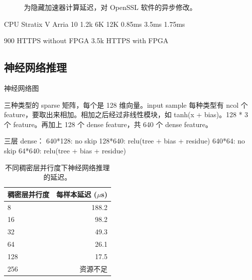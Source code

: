 \begin{figure}[htbp]
	\centering
	\hspace{0.02\textwidth}
	\caption{为隐藏加速器计算延迟，对 OpenSSL 软件的异步修改。}
\end{figure}

CPU   Stratix V     Arria 10
1.2k  6K            12K
0.85ms 3.5ms        1.75ms

900 HTTPS without FPGA
3.5k HTTPS with FPGA

\subsection{神经网络推理}

神经网络图

三种类型的 sparse 矩阵，每个是 128 维向量。input sample 每种类型有 ncol 个 feature，要取出来相加。相加之后经过非线性模块，如 tanh(x + bias)。128 * 3 个 feature。再加上 128 个 dense feature，共 640 个 dense feature。

三层 dense：
640*128: no skip
128*640: relu(tree + bias + residue)
640*64: no skip
64*640: relu(tree + bias + residue)

\begin{table}[htbp]
	\centering
	\caption{不同稠密层并行度下神经网络推理的延迟。}
	\label{clicknp:tab:neural-network}
	\small
	\begin{tabular}{l|r}
		\toprule
		稠密层并行度 & 每样本延迟 ($\mu$s) \\
		\midrule
		8 & 188.2 \\
		16 & 98.2 \\
		32 & 49.3 \\
		64 & 26.1 \\
		128 & 17.5 \\
		256 & 资源不足 \\
		\bottomrule
	\end{tabular}
\end{table}


